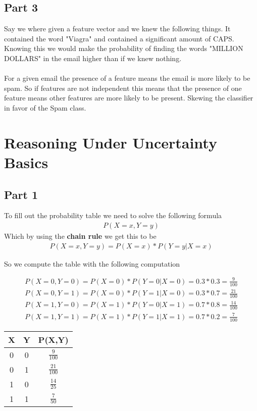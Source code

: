 \documentclass[a4paper, 12pt]{article}
\begin{document}
		\subsection{Part 3}
			Say we where given a feature vector and we knew the following things. It contained the word "Viagra" and contained a significant amount of CAPS. Knowing this we would make the probability of finding the words "MILLION DOLLARS" in the email higher than if we knew nothing.
			\\\\
			For a given email the presence of a feature means the email is more likely to be spam. So if features are not independent this means that the presence of one feature means other features are more likely to be present. Skewing the classifier in favor of the Spam class.			
	
	\section{Reasoning Under Uncertainty Basics}
		\subsection{Part 1}
			To fill out the probability table we need to solve the following formula
			\begin{align*}
				P(X = x, Y = y)
			\end{align*}
			Which by using the \textbf{chain rule} we get this to be 
			\begin{align*}
				P(X = x, Y = y) = P(X = x) * P(Y = y|X = x)
			\end{align*}
				
			So we compute the table with the following computation				
				
			\begin{align*}
				P(X = 0, Y = 0) = P(X = 0) * P(Y = 0|X = 0) = 0.3 * 0.3 = \frac{9}{100}\\
				P(X = 0, Y = 1) = P(X = 0) * P(Y = 1|X = 0) = 0.3 * 0.7 = \frac{21}{100}\\
				P(X = 1, Y = 0) = P(X = 1) * P(Y = 0|X = 1) = 0.7 * 0.8 = \frac{14}{100}\\
				P(X = 1, Y = 1) = P(X = 1) * P(Y = 1|X = 1) = 0.7 * 0.2 = \frac{7}{100}
			\end{align*}
			
			\begin{center}
				\begin{tabular}{|c|c|c|}
					\hline
					X & Y & P(X,Y)\\
					\hline
					0 & 0 & $\frac{9}{100}$\\
					0 & 1 & $\frac{21}{100}$\\
					1 & 0 & $\frac{14}{25}$\\
					1 & 1 & $\frac{7}{50}$\\
					\hline
				\end{tabular}
			\end{center}
			
\end{document}
